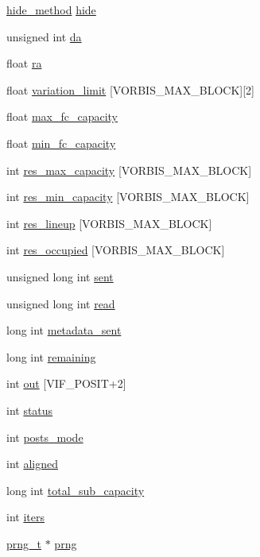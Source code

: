 \begin{DoxyCompactItemize}
\hyperlink{structsteganos__state__t_ad48f948c5024ec76b3a9bece54124d66}{hide\_\-method} \hyperlink{structsteganos__state__t_a8f4d58596c9f13fabefc97efb5d2d301}{hide}
\item 
unsigned int \hyperlink{structsteganos__state__t_a3838589e5ef92d6293c6e7a7f40ba491}{da}
\item 
float \hyperlink{structsteganos__state__t_a35b6704fbd31ab23984a713fdcef43a8}{ra}
\item 
float \hyperlink{structsteganos__state__t_a5382346902b6d6567614b77d9a0c6de3}{variation\_\-limit} \mbox{[}VORBIS\_\-MAX\_\-BLOCK\mbox{]}\mbox{[}2\mbox{]}
\item 
float \hyperlink{structsteganos__state__t_a5c33ee391f0074f8df354314ffd65c96}{max\_\-fc\_\-capacity}
\item 
float \hyperlink{structsteganos__state__t_a30506b9be18bd2a58856d6ba5a3fd15f}{min\_\-fc\_\-capacity}
\item 
int \hyperlink{structsteganos__state__t_afc33131ff2db5dc8a1f31a6ba5f1c724}{res\_\-max\_\-capacity} \mbox{[}VORBIS\_\-MAX\_\-BLOCK\mbox{]}
\item 
int \hyperlink{structsteganos__state__t_a2bbaeab1769db3e7021791701f05a929}{res\_\-min\_\-capacity} \mbox{[}VORBIS\_\-MAX\_\-BLOCK\mbox{]}
\item 
int \hyperlink{structsteganos__state__t_ae9b6a306ba7eda4266782af5429b097c}{res\_\-lineup} \mbox{[}VORBIS\_\-MAX\_\-BLOCK\mbox{]}
\item 
int \hyperlink{structsteganos__state__t_add02079c2fba135c27eca945cd6fdd53}{res\_\-occupied} \mbox{[}VORBIS\_\-MAX\_\-BLOCK\mbox{]}
\item 
unsigned long int \hyperlink{structsteganos__state__t_af5f22c44dbdd3ffe809f6dee20ec2343}{sent}
\item 
unsigned long int \hyperlink{structsteganos__state__t_a0a1685f67dade1dc4c5f23458d9abdd9}{read}
\item 
long int \hyperlink{structsteganos__state__t_a2e6797670afeb03e81514e1b8e5b53b7}{metadata\_\-sent}
\item 
long int \hyperlink{structsteganos__state__t_a17f9b729e28f08375fd0ae7679f98436}{remaining}
\item 
int \hyperlink{structsteganos__state__t_ac2ef43fc18298daa20ecfc6357f93e5b}{out} \mbox{[}VIF\_\-POSIT+2\mbox{]}
\item 
int \hyperlink{structsteganos__state__t_a5065391aa062854d0b9ce9eefe3a9509}{status}
\item 
int \hyperlink{structsteganos__state__t_ab843be033e7bfc4839814d751ba3f0b7}{posts\_\-mode}
\item 
int \hyperlink{structsteganos__state__t_a045c8296b2a0d027a5bfe22b187340b2}{aligned}
\item 
long int \hyperlink{structsteganos__state__t_ae8215dc4cb883543dd4bd7a47a475d74}{total\_\-sub\_\-capacity}
\item 
int \hyperlink{structsteganos__state__t_aa220ce82394bee0330d0de96586a9f38}{iters}
\item 
\hyperlink{structprng__t}{prng\_\-t} $\ast$ \hyperlink{structsteganos__state__t_a8572fc70a201b28fe897eaa304caf400}{prng}
\end{DoxyCompactItemize}


